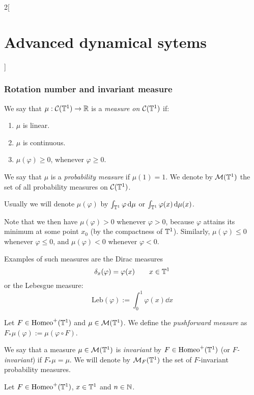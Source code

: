 \documentclass[../../../main_math.tex]{subfiles}
\begin{document}
\begin{multicols}{2}[\section{Advanced dynamical sytems}]
  \subsubsection{Rotation number and invariant measure}
  \begin{definition}
    We say that $\mu:\mathcal{C}(\mathbb{T}^1)\to\mathbb{R}$ is a \emph{measure on $\mathcal{C}(\mathbb{T}^1)$} if:
    \begin{enumerate}
      \item $\mu$ is linear.
      \item $\mu$ is continuous.
      \item $\mu(\varphi)\geq 0$, whenever $\varphi\geq 0$.
    \end{enumerate}
    We say that $\mu$ is a \emph{probability measure} if $\mu(1)=1$. We denote by $\mathcal{M}(\mathbb{T}^1)$ the set of all probability measures on $\mathcal{C}(\mathbb{T}^1)$.
  \end{definition}
  \begin{remark}
    Usually we will denote $\mu(\varphi)$ by $\int_{\mathbb{T}^1}\varphi\dd{\mu}$ or $\int_{\mathbb{T}^1}\varphi(x)\dd{\mu(x)}$.
  \end{remark}
  \begin{remark}
    Note that we then have $\mu(\varphi)>0$ whenever $\varphi>0$, because $\varphi$ attains its minimum at some point $x_0$ (by the compactness of $\mathbb{T}^1$). Similarly, $\mu(\varphi)\leq 0$ whenever $\varphi\leq 0$, and $\mu(\varphi)<0$ whenever $\varphi<0$.
  \end{remark}
  \begin{remark}
    Examples of such measures are the Dirac measures
    $$\delta_x(\varphi)=\varphi(x)\qquad x\in \mathbb{T}^1$$
    or the Lebesgue measure:
    $$\text{Leb}(\varphi):=\int_{0}^1\varphi(x)\dd{x}$$
  \end{remark}
  \begin{definition}
    Let $F\in \mathrm{Homeo}^+(\mathbb{T}^1)$ and $\mu\in \mathcal{M}(\mathbb{T}^1)$. We define the \emph{pushforward measure} as $F_*\mu(\varphi):=\mu(\varphi\circ F)$.
  \end{definition}
  \begin{definition}
    We say that a measure $\mu\in\mathcal{M}(\mathbb{T}^1)$ is \emph{invariant} by $F\in\mathrm{Homeo}^+(\mathbb{T}^1)$ (or \emph{$F$-invariant}) if $F_*\mu=\mu$. We will denote by $\mathcal{M}_F(\mathbb{T}^1)$ the set of $F$-invariant probability measures.
  \end{definition}
  \begin{proposition}
    Let $F\in \mathrm{Homeo}^+(\mathbb{T}^1)$, $x\in\mathbb{T}^1$ and $n\in\mathbb{N}$.

\end{proposition}
\end{multicols}
\end{document}
